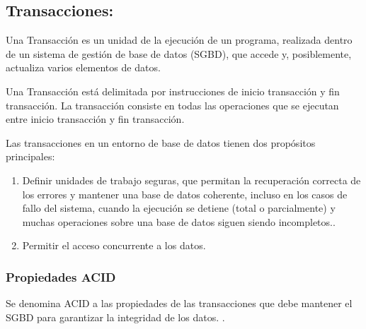 \subsection{Transacciones:}	

Una Transacción es un unidad de la ejecución de un programa, realizada dentro de
un sistema de gestión de base de datos (SGBD),  que accede y, posiblemente,
actualiza varios elementos de datos.

Una Transacción está delimitada por instrucciones de inicio transacción y fin
transacción. La transacción consiste en todas las operaciones que se ejecutan
entre inicio transacción y fin transacción.

Las transacciones en un entorno de base de datos tienen dos propósitos
principales:

\begin {enumerate}
  \item Definir unidades de trabajo seguras, que permitan la recuperación
  correcta de los errores y mantener una base de datos coherente, incluso en
  los casos de fallo del sistema, cuando la ejecución se detiene (total o
  parcialmente) y muchas operaciones sobre una base de datos siguen siendo
  incompletos..
  
  \item Permitir el acceso concurrente a los datos.
   
\end{enumerate}

\subsubsection{Propiedades ACID}
\label{sec:ACID}
Se denomina ACID a las propiedades de las transacciones que debe mantener el
SGBD para garantizar la integridad de los datos. \cite{HaerderReuter83}.

